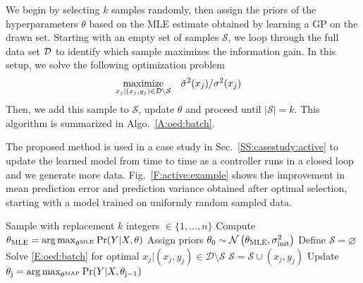 We begin by selecting \(k\) samples randomly, %
then assign the priors of the hyperparameters \(\theta\) based on the MLE estimate obtained by learning a GP on the drawn set.
Starting with an empty set of samples \(\mathcal{S}\), %
we loop through the full data set \(\mathcal{D}\) to identify which sample maximizes the information gain. In this setup, we solve the following optimization problem
\begin{align}
\label{E:oed:batch}
\maximize_{x_{j}|(x_j,y_j) \in \mathcal{D} \setminus \mathcal{S}} & \ \ \ \tilde{\sigma}^2(x_j)/{\sigma}^2(x_j) 
\end{align}
Then, we add this sample to \(\mathcal{S}\), update \(\theta\) and proceed until \(|\mathcal{S}|=k\).
This algorithm is summarized in Algo.~\ref{A:oed:batch}. 

The proposed method is used in a case study in Sec.~\ref{SS:casestudy:active} to update the learned model from time to time as a controller runs in a closed loop and we generate more data.
Fig.~\ref{F:active:example} shows the improvement in mean prediction error and prediction variance obtained after optimal selection, starting with a model trained on uniformly random sampled data. %

\begin{algorithm}[!tb]
	\caption{Optimal subset of data selection}
	\label{A:oed:batch}
	\begin{algorithmic}[1]
		\State Sample with replacement \(k\) integers \( \in \{1,\dots,n\} \)
		\State Compute \( \theta_{\mathrm{MLE}} = \operatorname*{arg\,max}_{\theta^{\mathrm{MLE}}} \Pr(Y \vert X, \theta)\)
		\State Assign priors \(\theta_{\mathrm{0}} \sim \operatorname*{\mathcal{N}}\left(\theta_{\mathrm{MLE}}, \sigma^2_{\mathrm{init}}\right)\)
		\EndProcedure
		\State Define \(\mathcal{S} = \varnothing\)
		\State Solve \eqref{E:oed:batch} for optimal \({x_{j} \vert (x_j,y_j) \in \mathcal{D} \setminus \mathcal{S}} \)
		\State \(\mathcal{S} = \mathcal{S} \cup (x_j,y_j) \)
		\State Update \( \theta_{\mathrm{j}} = \operatorname*{arg\,max}_{\theta^{\mathrm{MAP}}} \Pr(Y \vert X, \theta_{\mathrm{j-1}})\)
		\EndWhile
		\EndProcedure
	\end{algorithmic}
\end{algorithm}

\begin{figure*}[t]
	\centering
	\setlength{} 
	\setlength{}
	 \hspace{0.5cm}
	
	\caption{Left: Selection using random sampling. Right: Optimal subset of data selection. Starting with the random sampling, we use the model parameters and apply Algo.~\ref{A:oed:batch} to improve the model accuracy. Both the mean prediction error and the prediction variance are lower for optimal selection based on information gain. }
	\captionsetup{justification=centering}
    \vspace{-10pt}    
	\label{F:active:example}
\end{figure*}


